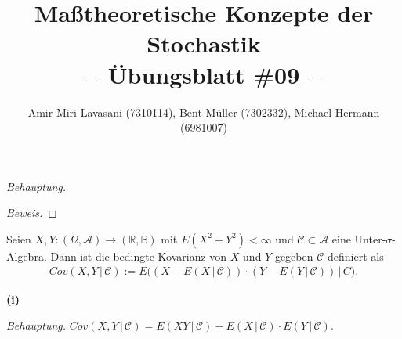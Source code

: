 \documentclass[10pt]{article}
\newcommand{\R}{\mathbb{R}}
\newcommand{\A}{\mathcal{A}}
\newcommand{\C}{\mathcal{C}}
\newcommand{\B}{\mathbb{B}}
\newcommand{\gap}{\,\vert\,}
\newcommand{\beh}{\textit{Behauptung. }}
\newenvironment{Aufgabe}[2][Aufgabe]{\begin{trivlist}
\item[\hskip \labelsep {\bfseries #1}\hskip \labelsep {\bfseries #2.}]}{\end{trivlist}}
\begin{document}
 
\title{ \textbf{Maßtheoretische Konzepte der Stochastik \\ -- Übungsblatt \#09 --} }

\author{Amir Miri Lavasani (7310114), Bent Müller (7302332),
        Michael Hermann (6981007)}
\maketitle

\begin{Aufgabe}{1} %
\end{Aufgabe}

\beh

\begin{proof}[Beweis]
	 
\end{proof}

\begin{Aufgabe}{2} %
	Seien $X,Y : (\Omega,\A)\to (\R,\B)$ mit $E(X^2+Y^2) < \infty$ und $\C\subset\A$ eine Unter-$\sigma$-Algebra. Dann 
	ist die bedingte Kovarianz von $X$ und $Y$ gegeben $\C$ definiert als
	\begin{align*}
		Cov(X,Y \gap \C) := E\big( (X-E(X\gap\C)) \cdot (Y-E(Y\gap\C)) \gap C \big).
	\end{align*}
\end{Aufgabe}

\textbf{(i)}

\beh $Cov(X,Y \gap \C) = E(XY \gap \C) - E(X \gap \C) \cdot E(Y \gap \C)$.
\end{document}

